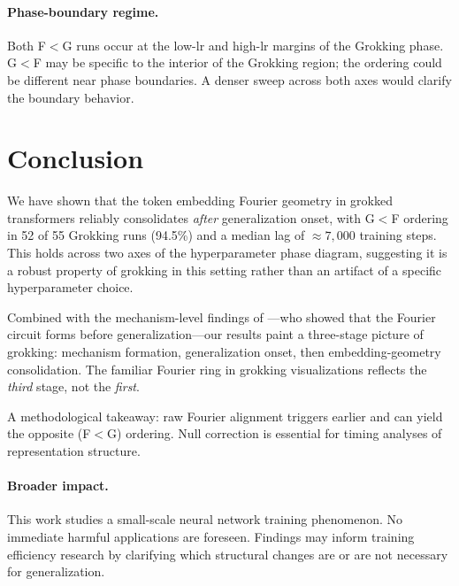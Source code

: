 \documentclass{article}
\begin{document}
\paragraph{Phase-boundary regime.}
Both F$<$G runs occur at the low-lr and high-lr margins of the
Grokking phase.
G$<$F may be specific to the interior of the Grokking region;
the ordering could be different near phase boundaries.
A denser sweep across both axes would clarify the boundary behavior.

\section{Conclusion}
\label{sec:conclusion}

We have shown that the token embedding Fourier geometry in grokked
transformers reliably consolidates \emph{after} generalization onset,
with G$<$F ordering in 52 of 55 Grokking runs (94.5\%) and a median
lag of $\approx7{,}000$ training steps.
This holds across two axes of the hyperparameter phase diagram,
suggesting it is a robust property of grokking in this setting rather
than an artifact of a specific hyperparameter choice.

Combined with the mechanism-level findings of \citet{nanda2023progress}
---who showed that the Fourier circuit forms before generalization---our
results paint a three-stage picture of grokking: mechanism formation,
generalization onset, then embedding-geometry consolidation.
The familiar Fourier ring in grokking visualizations reflects the
\emph{third} stage, not the \emph{first}.

A methodological takeaway: raw Fourier alignment triggers earlier and
can yield the opposite (F$<$G) ordering.
Null correction is essential for timing analyses of representation
structure.

\paragraph{Broader impact.}
This work studies a small-scale neural network training phenomenon.
No immediate harmful applications are foreseen.
Findings may inform training efficiency research by clarifying which
structural changes are or are not necessary for generalization.




\appendix
\end{document}

